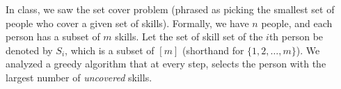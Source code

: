 \documentclass[addpoints, 11pt]{exam}
\begin{document}
\begin{questions}
In class, we saw the set cover problem (phrased as picking the smallest set of people who cover a given set of skills). Formally, we have $n$ people, and each person has a subset of $m$ skills. Let the set of skill set of the $i$th person be denoted by $S_i$, which is a subset of $[m]$ (shorthand for $\{1, 2, \dots, m\}$). We analyzed a greedy algorithm that at every step, selects the person with the largest number of {\em uncovered} skills.
\end{questions}
\end{document}
